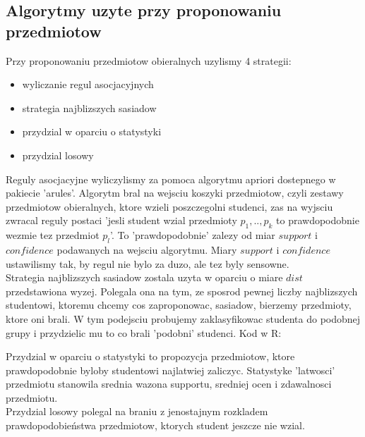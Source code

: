 \documentclass[licencjacka]{pracamgr}
\begin{document}
\subsection{Algorytmy uzyte przy proponowaniu przedmiotow}
Przy proponowaniu przedmiotow obieralnych uzylismy 4 strategii:
\begin{itemize}
 \item wyliczanie regul asocjacyjnych
 \item strategia najblizszych sasiadow
 \item przydzial w oparciu o statystyki
 \item przydzial losowy
\end{itemize}
Reguly asocjacyjne wyliczylismy za pomoca algorytmu apriori dostepnego w pakiecie 'arules'. Algorytm bral na wejsciu koszyki
przedmiotow, czyli zestawy przedmiotow obieralnych, ktore wzieli poszczegolni studenci, zas na wyjsciu zwracal reguly postaci
'jesli student wzial przedmioty $p_{1},..,p_{k}$ to prawdopodobnie wezmie tez przedmiot $p_{l}$'. To 'prawdopodobnie' 
zalezy od miar $support$ i $confidence$ podawanych na wejsciu algorytmu.
Miary $support$ i $confidence$ ustawilismy tak, by regul nie bylo za duzo, ale tez byly sensowne. \\
Strategia najblizszych sasiadow zostala uzyta w oparciu o miare $dist$ przedstawiona wyzej. Polegala ona na tym, ze 
sposrod pewnej liczby najblizszych studentowi, ktoremu chcemy cos zaproponowac, sasiadow, bierzemy przedmioty, ktore oni brali.
W tym podejsciu probujemy zaklasyfikowac studenta do podobnej grupy i przydzielic mu to co brali 'podobni' studenci. Kod w R:

Przydzial w oparciu o statystyki to propozycja przedmiotow, ktore prawdopodobnie byloby studentowi najlatwiej zaliczyc.
Statystyke 'latwosci' przedmiotu stanowila srednia wazona supportu, sredniej ocen i zdawalnosci przedmiotu. \\
Przydzial losowy polegal na braniu z jenostajnym rozkladem prawdopodobieństwa przedmiotow, ktorych student jeszcze nie wzial.
\end{document}
